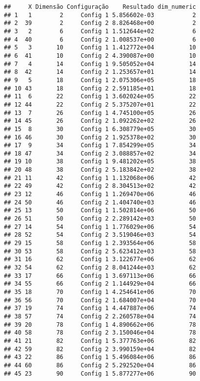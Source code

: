 \documentclass[
]{article}
\begin{document}
\begin{verbatim}
##     X Dimensão Configuração    Resultado dim_numeric
## 1   1        2     Config 1 5.856602e-03           2
## 2  39        2     Config 2 8.826468e+00           2
## 3   2        6     Config 1 1.512644e+02           6
## 4  40        6     Config 2 1.008537e+00           6
## 5   3       10     Config 1 1.412772e+04          10
## 6  41       10     Config 2 4.390087e+00          10
## 7   4       14     Config 1 9.505052e+04          14
## 8  42       14     Config 2 1.253657e+01          14
## 9   5       18     Config 1 2.075306e+05          18
## 10 43       18     Config 2 2.591185e+01          18
## 11  6       22     Config 1 3.602024e+05          22
## 12 44       22     Config 2 5.375207e+01          22
## 13  7       26     Config 1 4.745100e+05          26
## 14 45       26     Config 2 1.092262e+02          26
## 15  8       30     Config 1 6.308779e+05          30
## 16 46       30     Config 2 1.925378e+02          30
## 17  9       34     Config 1 7.854299e+05          34
## 18 47       34     Config 2 3.088857e+02          34
## 19 10       38     Config 1 9.481202e+05          38
## 20 48       38     Config 2 5.183842e+02          38
## 21 11       42     Config 1 1.132068e+06          42
## 22 49       42     Config 2 8.304513e+02          42
## 23 12       46     Config 1 1.269470e+06          46
## 24 50       46     Config 2 1.404740e+03          46
## 25 13       50     Config 1 1.502814e+06          50
## 26 51       50     Config 2 2.289142e+03          50
## 27 14       54     Config 1 1.776029e+06          54
## 28 52       54     Config 2 3.519046e+03          54
## 29 15       58     Config 1 2.393564e+06          58
## 30 53       58     Config 2 5.623412e+03          58
## 31 16       62     Config 1 3.122677e+06          62
## 32 54       62     Config 2 8.041244e+03          62
## 33 17       66     Config 1 3.697113e+06          66
## 34 55       66     Config 2 1.144929e+04          66
## 35 18       70     Config 1 4.254641e+06          70
## 36 56       70     Config 2 1.684007e+04          70
## 37 19       74     Config 1 4.447887e+06          74
## 38 57       74     Config 2 2.260578e+04          74
## 39 20       78     Config 1 4.890662e+06          78
## 40 58       78     Config 2 3.150046e+04          78
## 41 21       82     Config 1 5.377763e+06          82
## 42 59       82     Config 2 3.990159e+04          82
## 43 22       86     Config 1 5.496084e+06          86
## 44 60       86     Config 2 5.292520e+04          86
## 45 23       90     Config 1 5.877277e+06          90

\end{verbatim}
\end{document}
